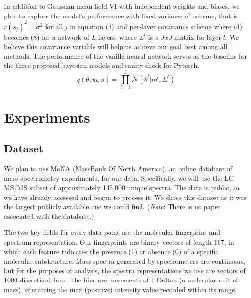 \documentclass{article}
\begin{document}
In addition to Gaussian mean-field VI with independent weights and biases, we plan to explore the model’s performance with fixed variance $\sigma^2$ scheme, that is $r(s_j)^2 = \sigma^2 $ for all $j$ in equation (4) and per-layer covariance scheme where (4) becomes (8) for a network of $L$ layers, where $\Sigma^l$ is a $JxJ$ matrix for layer $l$. We believe this covariance variable will help us achieve our goal best among all methods. The performance of the vanilla neural network serves as the baseline for the three proposed bayesian models and sanity check for Pytorch.
\begin{equation}
    q(\theta; m,s) = \prod_{l=1}^L \mathcal{N}(\theta^l| m^l, \Sigma^l)
\end{equation}

\section{Experiments}
\subsection{Dataset}
We plan to use MoNA (MassBank Of North America), an online database of mass spectrometry experiments, for our data. Specifically, we will use the LC-MS/MS subset of approximately 145,000 unique spectra. The data is public, so we have already accessed and begun to process it. We chose this dataset as it was the largest publicly available one we could find. (\textit{Note}: There is no paper associated with the database.)

The two key fields for every data point are the molecular fingerprint and spectrum representation. Our fingerprints are binary vectors of length 167, in which each feature indicates the presence (1) or absence (0) of a specific molecular substructure. Mass spectra generated by spectrometers are continuous, but for the purposes of analysis, the spectra representations we use are vectors of 1000 discretized bins. The bins are increments of 1 Dalton (a molecular unit of mass), containing the max (positive) intensity value recorded within its range.
\end{document}
